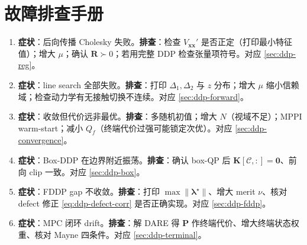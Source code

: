 \section*{故障排查手册}
\begin{enumerate}
  \item \textbf{症状}：后向传播 Cholesky 失败。\textbf{排查}：检查 $V_{\mathbf{xx}}'$ 是否正定（打印最小特征值）；增大 $\mu$；确认 $\mathbf{R}\succ0$；若用完整 DDP 检查张量项符号。对应 \cref{sec:ddp-reg}。
  \item \textbf{症状}：line search 全部失败。\textbf{排查}：打印 $\Delta_1,\Delta_2$ 与 $z$ 分布；增大 $\mu$ 缩小信赖域；检查动力学有无接触切换不连续。对应 \cref{sec:ddp-forward}。
  \item \textbf{症状}：收敛但代价远非最优。\textbf{排查}：多随机初值；增大 $N$（视域不足）；MPPI warm-start；减小 $Q_f$（终端代价过强可能锁定次优）。对应 \cref{sec:ddp-convergence}。
  \item \textbf{症状}：Box-DDP 在边界附近振荡。\textbf{排查}：确认 box-QP 后 $\mathbf{K}[\mathcal{C},:]=\mathbf{0}$、前向 clip 一致。对应 \cref{sec:ddp-box}。
  \item \textbf{症状}：FDDP gap 不收敛。\textbf{排查}：打印 $\max\|\boldsymbol{\lambda}^\star\|$、增大 merit $\nu$、核对 defect 修正 \cref{eq:ddp-defect-corr} 是否正确实现。对应 \cref{sec:ddp-fddp}。
  \item \textbf{症状}：MPC 闭环 drift。\textbf{排查}：解 DARE 得 $\mathbf{P}$ 作终端代价、增大终端状态权重、核对 Mayne 四条件。对应 \cref{sec:ddp-terminal}。
\end{enumerate}
